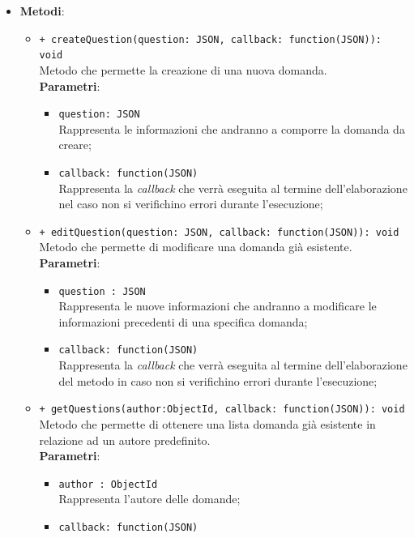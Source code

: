 \begin{itemize}
\begin{itemize}
\begin{itemize}
		\end{itemize}
	\end{itemize}
\item \textbf{Metodi}:
	\begin{itemize}
	\item \texttt{+ createQuestion(question: JSON, callback: function(JSON)): void} \\
	Metodo che permette la creazione di una nuova domanda. \\
		\textbf{Parametri}:
		\begin{itemize}
			\item \texttt{question: JSON} \\
			Rappresenta le informazioni che andranno a comporre la domanda da creare;
			\item \texttt{callback: function(JSON)} \\
			Rappresenta la \textit{callback} che verrà eseguita al termine dell'elaborazione nel caso non si verifichino errori durante l'esecuzione;
		\end{itemize}   
	\item \texttt{+ editQuestion(question: JSON, callback: function(JSON)): void} \\
	Metodo che permette di modificare una domanda già esistente. \\
		\textbf{Parametri}:
		\begin{itemize}
			\item \texttt{question : JSON} \\
			Rappresenta le nuove informazioni che andranno a modificare le informazioni precedenti di una specifica domanda;
			\item \texttt{callback: function(JSON)} \\
			Rappresenta la \textit{callback} che verrà eseguita al termine dell'elaborazione del metodo in caso non si verifichino errori durante l'esecuzione;
		\end{itemize}
	\item \texttt{+ getQuestions(author:ObjectId, callback: function(JSON)): void} \\
	Metodo che permette di ottenere una lista domanda già esistente in relazione ad un autore predefinito. \\
		\textbf{Parametri}:
		\begin{itemize}
			\item \texttt{author : ObjectId} \\
			Rappresenta l'autore delle domande;
			\item \texttt{callback: function(JSON)} \\

\end{itemize}
\end{itemize}
\end{itemize}
